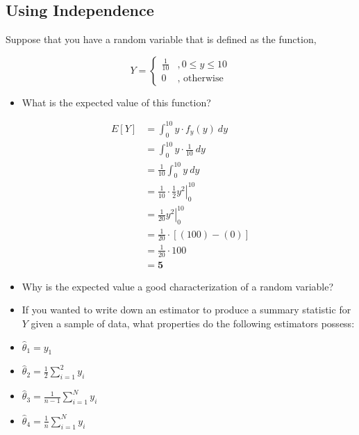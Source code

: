 \documentclass[
]{article}
\providecommand{\tightlist}{%
  \setlength{\itemsep}{0pt}\setlength{\parskip}{0pt}}
\begin{document}
\hypertarget{using-independence}{%
\subsection{Using Independence}\label{using-independence}}

Suppose that you have a random variable that is defined as the function,

\[
Y = 
  \begin{cases}
    \frac{1}{10} & ,0 \leq y \leq 10 \\ 
    0 & \text{, otherwise}
  \end{cases}
\]

\begin{itemize}
\tightlist
\item
  What is the expected value of this function?
\end{itemize}

\[
\begin{aligned}
  E[Y]  &= \int_{0}^{10} y \cdot f_{y}(y) \ dy                       \\ 
        &= \int_{0}^{10} y \cdot \frac{1}{10} \ dy                   \\ 
        &= \frac{1}{10}\int_{0}^{10} y \ dy                          \\ 
        &= \left.\frac{1}{10} \cdot \frac{1}{2}  y^2\right|_{0}^{10} \\ 
        &= \left.\frac{1}{20}  y^{2} \right|_{0}^{10}                \\ 
        &= \frac{1}{20} \cdot \left[(100) - (0) \right]              \\ 
        &= \frac{1}{20} \cdot 100                                    \\
        &= \mathbf{5}
\end{aligned}
\]

\begin{itemize}
\item
  Why is the expected value a good characterization of a random variable?
\item
  If you wanted to write down an estimator to produce a summary statistic for \(Y\) given a sample of data, what properties do the following estimators possess:
\item
  \(\hat{\theta}_{1} = y_{1}\)
\item
  \(\hat{\theta}_{2} = \frac{1}{2} \displaystyle\sum_{i=1}^{2} y_{i}\)
\item
  \(\hat{\theta}_{3} = \frac{1}{n-1} \displaystyle\sum_{i=1}^{N} y_{i}\)
\item
  \(\hat{\theta}_{4} = \frac{1}{n} \displaystyle\sum_{i=1}^{N} y_{i}\)
\end{itemize}
\end{document}
